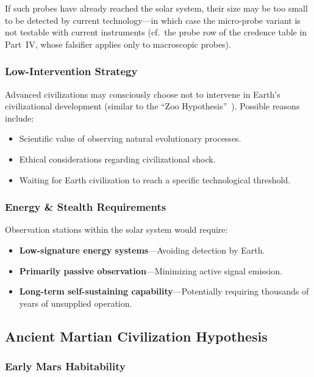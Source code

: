 \documentclass[aps,prd,twocolumn,superscriptaddress,nofootinbib]{revtex4-2}
\begin{document}
If such probes have already reached the solar system, their size may be too small to be detected by current technology---in which case the micro-probe variant is not testable with current instruments (cf.\ the probe row of the credence table in Part~IV, whose falsifier applies only to macroscopic probes).

\subsubsection{Low-Intervention Strategy}\label{sec:zoo-hypothesis}

Advanced civilizations may consciously choose not to intervene in Earth's civilizational development (similar to the ``Zoo Hypothesis''~\cite{Ball1973}). Possible reasons include:

\begin{itemize}
  \item Scientific value of observing natural evolutionary processes.
  \item Ethical considerations regarding civilizational shock.
  \item Waiting for Earth civilization to reach a specific technological threshold.
\end{itemize}

\subsubsection{Energy \& Stealth Requirements}\label{sec:observer-energy}

Observation stations within the solar system would require:

\begin{itemize}
  \item \textbf{Low-signature energy systems}---Avoiding detection by Earth.
  \item \textbf{Primarily passive observation}---Minimizing active signal emission.
  \item \textbf{Long-term self-sustaining capability}---Potentially requiring thousands of years of unsupplied operation.
\end{itemize}

\subsection{Ancient Martian Civilization Hypothesis}\label{sec:mars-civ}

\subsubsection{Early Mars Habitability}\label{sec:mars-habit}
\end{document}
